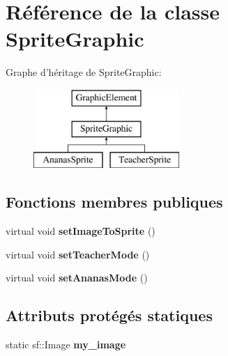 \hypertarget{class_sprite_graphic}{\section{Référence de la classe Sprite\-Graphic}
\label{class_sprite_graphic}
}
Graphe d'héritage de Sprite\-Graphic\-:\begin{figure}[H]
\begin{center}
\leavevmode
\includegraphics[height=3.000000cm]{class_sprite_graphic}
\end{center}
\end{figure}
\subsection*{Fonctions membres publiques}
\begin{DoxyCompactItemize}
\item 
\hypertarget{class_sprite_graphic_a4a559dacce663979705382433fca8c5a}{virtual void {\bfseries set\-Image\-To\-Sprite} ()}\label{class_sprite_graphic_a4a559dacce663979705382433fca8c5a}

\item 
\hypertarget{class_sprite_graphic_af855afb67c7368f31708d8175741367a}{virtual void {\bfseries set\-Teacher\-Mode} ()}\label{class_sprite_graphic_af855afb67c7368f31708d8175741367a}

\item 
\hypertarget{class_sprite_graphic_afae9b4e50c4787d6487bb9930989c225}{virtual void {\bfseries set\-Ananas\-Mode} ()}\label{class_sprite_graphic_afae9b4e50c4787d6487bb9930989c225}

\end{DoxyCompactItemize}
\subsection*{Attributs protégés statiques}
\begin{DoxyCompactItemize}
\item 
\hypertarget{class_sprite_graphic_a405a4e6f383dfd0c3a7c68c82ed35e5f}{static sf\-::\-Image {\bfseries my\-\_\-image}}\label{class_sprite_graphic_a405a4e6f383dfd0c3a7c68c82ed35e5f}

\end{DoxyCompactItemize}
